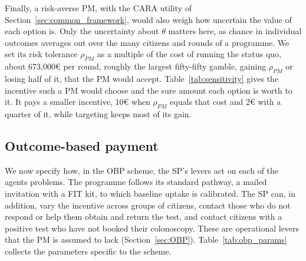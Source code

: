 \documentclass[12pt]{article}
\begin{document}
Finally, a risk-averse PM, with the CARA utility of Section~\ref{sec:common_framework}, would also weigh how uncertain the value of each option is. Only the uncertainty about $\theta$ matters here, as chance in individual outcomes averages out over the many citizens and rounds of a programme. We set its risk tolerance $\rho_{PM}$ as a multiple of the cost of running the status quo, about 673{,}000€ per round, roughly the largest fifty-fifty gamble, gaining $\rho_{PM}$ or losing half of it, that the PM would accept. Table~\ref{tab:sensitivity} gives the incentive such a PM would choose and the sure amount each option is worth to it. It pays a smaller incentive, 10€ when $\rho_{PM}$ equals that cost and 2€ with a quarter of it, while targeting keeps most of its gain.





\subsection{Outcome-based payment} \label{sec:obp_modelling}
We now specify how, in the OBP scheme, the SP's levers act on each of the agents problems. The programme follows its standard pathway, a mailed invitation with a FIT kit, to which baseline uptake is calibrated. The SP can, in addition, vary the incentive across groups of citizens, contact those who do not respond or help them obtain and return the test, and contact citizens with a positive test who have not booked their colonoscopy. These are operational levers that the PM is assumed to lack (Section~\ref{sec:OBP}). Table~\ref{tab:obp_params} collects the parameters specific to the scheme.
\end{document}
